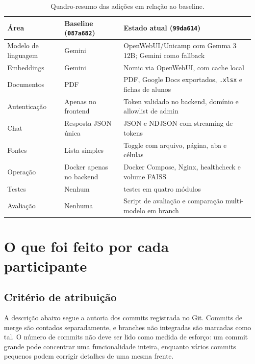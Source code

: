 \documentclass[12pt,a4paper]{article}
\newcommand{\commit}[1]{\texttt{#1}}
\begin{document}
\begin{table}[H]
\centering
\small
\begin{tabularx}{\textwidth}{@{}p{3.7cm} >{\raggedright\arraybackslash}X >{\raggedright\arraybackslash}X@{}}
\toprule
Área & Baseline (\commit{087a682}) & Estado atual (\commit{99da614}) \\
\midrule
Modelo de linguagem & Gemini & OpenWebUI/Unicamp com Gemma 3 12B; Gemini como fallback \\
Embeddings & Gemini & Nomic via OpenWebUI, com cache local \\
Documentos & PDF & PDF, Google Docs exportados, \texttt{.xlsx} e fichas de alunos \\
Autenticação & Apenas no frontend & Token validado no backend, domínio e allowlist de admin \\
Chat & Resposta JSON única & JSON e NDJSON com streaming de tokens \\
Fontes & Lista simples & Toggle com arquivo, página, aba e células \\
Operação & Docker apenas no backend & Docker Compose, Nginx, healthcheck e volume FAISS \\
Testes & Nenhum & 62 testes em quatro módulos \\
Avaliação & Nenhuma & Script de avaliação e comparação multi-modelo em branch \\
\bottomrule
\end{tabularx}
\caption{Quadro-resumo das adições em relação ao baseline.}
\label{tab:antesdepois}
\end{table}

\section{O que foi feito por cada participante}

\subsection{Critério de atribuição}

A descrição abaixo segue a autoria dos commits registrada no Git. Commits de merge
são contados separadamente, e branches não integradas são marcadas como tal. O
número de commits não deve ser lido como medida de esforço: um commit grande pode
concentrar uma funcionalidade inteira, enquanto vários commits pequenos podem
corrigir detalhes de uma mesma frente.
\end{document}
